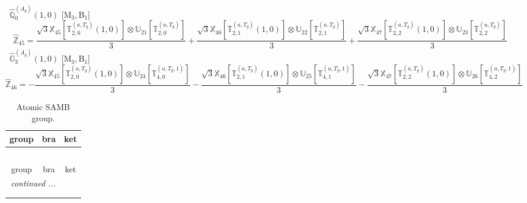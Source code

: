 \documentclass[fleqn,10pt,landscape]{article}
\begin{document}
\begin{itemize}
\begin{dmath*}
\end{dmath*}
\vspace{4mm}
\noindent {} $\,\,\,\hat{\mathbb{Q}}_{0}^{(A_{g})}(1,0)$ [M$_{3}$,\,B$_{1}$]
\begin{dmath*}
\hat{\mathbb{Z}}_{45}=\frac{\sqrt{3} \mathbb{X}_{45}[\mathbb{T}_{2,0}^{(a,T_{g})}(1,0)] \otimes\mathbb{U}_{21}[\mathbb{T}_{2,0}^{(u,T_{g})}]}{3} + \frac{\sqrt{3} \mathbb{X}_{46}[\mathbb{T}_{2,1}^{(a,T_{g})}(1,0)] \otimes\mathbb{U}_{22}[\mathbb{T}_{2,1}^{(u,T_{g})}]}{3} + \frac{\sqrt{3} \mathbb{X}_{47}[\mathbb{T}_{2,2}^{(a,T_{g})}(1,0)] \otimes\mathbb{U}_{23}[\mathbb{T}_{2,2}^{(u,T_{g})}]}{3}
\end{dmath*}
\vspace{4mm}
\noindent {} $\,\,\,\hat{\mathbb{G}}_{3}^{(A_{g})}(1,0)$ [M$_{3}$,\,B$_{1}$]
\begin{dmath*}
\hat{\mathbb{Z}}_{46}=- \frac{\sqrt{3} \mathbb{X}_{45}[\mathbb{T}_{2,0}^{(a,T_{g})}(1,0)] \otimes\mathbb{U}_{24}[\mathbb{T}_{4,0}^{(u,T_{g},1)}]}{3} - \frac{\sqrt{3} \mathbb{X}_{46}[\mathbb{T}_{2,1}^{(a,T_{g})}(1,0)] \otimes\mathbb{U}_{25}[\mathbb{T}_{4,1}^{(u,T_{g},1)}]}{3} - \frac{\sqrt{3} \mathbb{X}_{47}[\mathbb{T}_{2,2}^{(a,T_{g})}(1,0)] \otimes\mathbb{U}_{26}[\mathbb{T}_{4,2}^{(u,T_{g},1)}]}{3}
\end{dmath*}
\begin{center}
\renewcommand{\arraystretch}{1.3}
\begin{longtable}{c|c|c}
\caption{Atomic SAMB group.}
 \\
 \hline \hline
group & bra & ket \\ \hline \endfirsthead

\multicolumn{2}{l}{\tablename\ \thetable{}} \\
 \hline \hline
group & bra & ket \\ \hline \endhead

 \hline \hline
\multicolumn{2}{r}{\footnotesize\it continued ...} \\ \endfoot

 \hline \hline
\multicolumn{2}{r}{} \\ \endlastfoot


\end{longtable}
\end{center}
\end{itemize}
\end{document}
